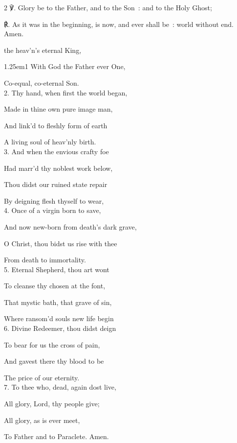 \begin{paracol}{2}
℣. Glory be to the Father, and to the Son~: and to the Holy Ghost;\par
℟. As it was in the beginning, is now, and ever shall be~: world without end. Amen.

\switchcolumn

\mattinsInvitatoryHymn\label{EasterDayInvitatory}

 the heav'n’s eternal King,


\begin{hangparas}{1.25em}{1}
With God the Father ever One,

Co-equal, co-eternal Son.\\

2. Thy hand, when first the world began,

Made in thine own pure image man,

And link'd to fleshly form of earth

A living soul of heav'nly birth.\\

3. And when the envious crafty foe

Had marr'd thy noblest work below,

Thou didst our ruined state repair

By deigning flesh thyself to wear,\\

4. Once of a virgin born to save,

And now new-born from death's dark grave,

O Christ, thou bidst us rise with thee

From death to immortality.\\

5. Eternal Shepherd, thou art wont

To cleanse thy chosen at the font,

That mystic bath, that grave of sin,

Where ransom'd souls new life begin\\

6. Divine Redeemer, thou didst deign

To bear for us the cross of pain,

And gavest there thy blood to be

The price of our eternity.\\

7. To thee who, dead, again dost live,

All glory, Lord, thy people give;

All glory, as is ever meet,

To Father and to Paraclete. Amen.
\end{hangparas}
\end{paracol}

